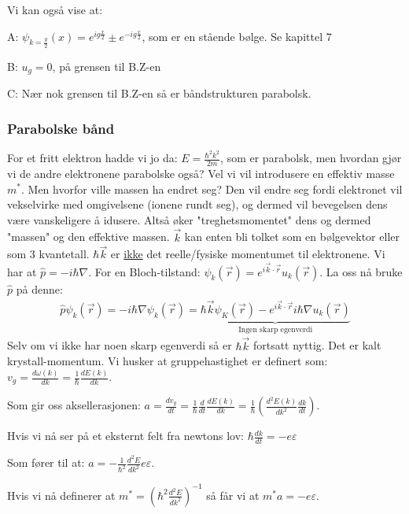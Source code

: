 \documentclass{article}
\begin{document}
Vi kan også vise at: 

A: $\psi_{k = \frac{g}{2}}(x) = e^{i g \frac{x}{2}} \pm e^{-ig\frac{x}{2}}$, som er en stående bølge. Se kapittel 7

B: $u_g = 0$, på grensen til B.Z-en

C: Nær nok grensen til B.Z-en så er båndstrukturen parabolsk.

\subsubsection{Parabolske bånd}
For et fritt elektron hadde vi jo da: $E = \frac{\hbar^2 k^2}{2m}$, som er parabolsk, men hvordan gjør vi de andre elektronene parabolske også? Vel vi vil introdusere en effektiv masse $m^*$. Men hvorfor ville massen ha endret seg? Den vil endre seg fordi elektronet vil vekselvirke med omgivelsene (ionene rundt seg), og dermed vil bevegelsen dens være vanskeligere å idusere. Altså øker "treghetsmomentet" dens og dermed "massen" og den effektive massen.
$\vec{k}$ kan enten bli tolket som en bølgevektor eller som 3 kvantetall. $\hbar\vec{k}$ er \underline{ikke} det reelle/fysiske momentumet til elektronene. Vi har at $\hat{p} = -i \hbar \nabla$. For en Bloch-tilstand: $\psi_k(\vec{r}) = e^{i \vec{k} \cdot \vec{r}} u_k(\vec{r})$. La oss nå bruke $\hat{p}$ på denne:
\begin{align*}
  \hat{p} \psi_k(\vec{r}) = -i \hbar \nabla \psi_k(\vec{r}) = \underbrace{\hbar \vec{k} \psi_K (\vec{r}) - e^{i \vec{k} \cdot \vec{r}} i \hbar \nabla u_k(\vec{r})}_{\text{Ingen skarp egenverdi}}
\end{align*}
Selv om vi ikke har noen skarp egenverdi så er $\hbar \vec{k}$ fortsatt nyttig. Det er kalt krystall-momentum.
Vi husker at gruppehastighet er definert som: $v_g = \frac{d \omega(k)}{dk} = \frac{1}{\hbar} \frac{dE(k)}{dk}$.

Som gir oss aksellerasjonen: $a = \frac{d v_g}{dt} = \frac{1}{\hbar} \frac{d}{dt} \frac{dE(k)}{dk} = \frac{1}{\hbar}\left (\frac{d^2 E(k)}{dk^2} \frac{dk}{dt}\right)$.

Hvis vi nå ser på et eksternt felt fra newtons lov: $\hbar \frac{dk}{dt} = -e \varepsilon$

Som fører til at: $a = -\frac{1}{\hbar^2} \frac{d^2 E}{dk^2} e \varepsilon$.

Hvis vi nå definerer at $m^* = \left(\hbar^2 \frac{d^2 E}{dk^2}\right)^{-1}$ så får vi at $m^*a=-e\varepsilon$.
\end{document}
